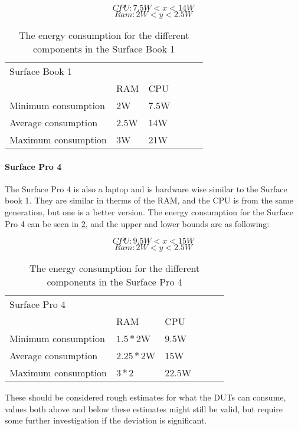 $$CPU: 7.5W < x < 14W $$
$$Ram: 2W < y < 2.5W $$

\begin{table}[ht]
    \begin{tabular}{llllll}
    \hline
    \multicolumn{5}{l}{Surface Book 1} \\
     & RAM\cite{buildComputerRAM} & CPU\cite{NotebookCPU} \\
    Minimum consumption & $2$W& $7.5$W \\ \hline
    Average consumption & $2.5$W& $14$W \\ \hline
    Maximum consumption & $3$W & $21$W \\ \hline
    \end{tabular}
    \caption{The energy consumption for the different components in the Surface Book 1}
    \label{tab:bookjuanEstEnergCon}    
\end{table}

\paragraph{Surface Pro 4} The Surface Pro 4 is also a laptop and is hardware wise similar to the Surface book 1. They are similar in therms of the RAM, and the CPU is from the same generation, but one is a better version. The energy consumption for the Surface Pro 4 can be seen in \cref{tab:proQuadroEstEnergCon}, and the upper and lower bounds are as following:

$$CPU: 9.5W < x < 15W $$
$$Ram: 2W < y < 2.5W $$

\begin{table}[ht]
    \begin{tabular}{llllll}
    \hline
    \multicolumn{5}{l}{Surface Pro 4} \\
     & RAM\cite{buildComputerRAM} & CPU\cite{IntelCPUSpec} \\
    Minimum consumption & $1.5 * 2$W& $9.5$W \\ \hline
    Average consumption & $2.25 * 2$W& $15$W \\ \hline
    Maximum consumption & $3 * 2$ & $22.5$W\\ \hline
    \end{tabular}
    \caption{The energy consumption for the different components in the Surface Pro 4}
    \label{tab:proQuadroEstEnergCon}    
\end{table}

These should be considered rough estimates for what the DUTs can consume, values both above and below these estimates might still be valid, but require some further investigation if the deviation is significant.
